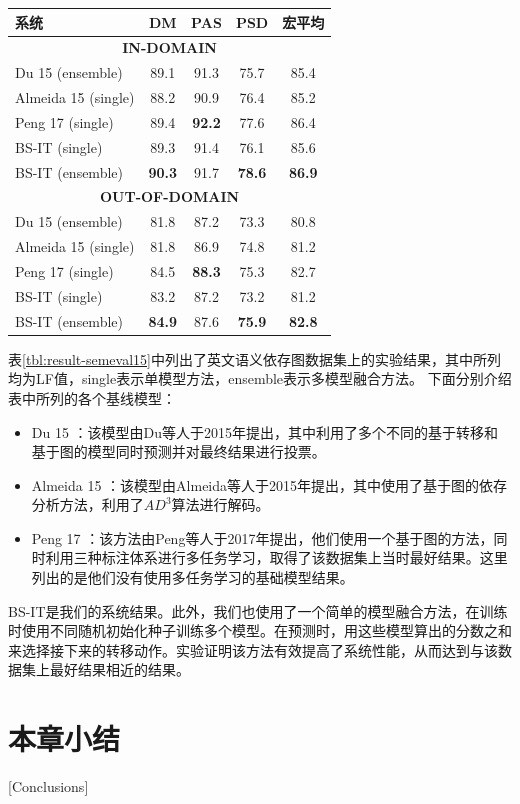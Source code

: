 \begin{table}[htpb]
	\centering
	\small
	\renewcommand{\arraystretch}{1.2}
	\begin{tabular}{l|ccc|c}
		\hline
		\bf 系统&\bf DM&\bf PAS&\bf PSD &\bf 宏平均\\
		\hline
		\multicolumn{5}{c}{\bf IN-DOMAIN}\\
		\hline
		Du 15 (ensemble) &89.1&91.3&75.7&85.4\\
		Almeida 15 (single) &88.2&90.9&76.4&85.2\\
		Peng 17 (single) &89.4&\bf 92.2&77.6&86.4\\
		\hline
		BS-IT (single) &89.3&91.4&76.1&85.6\\
		BS-IT (ensemble) &\bf 90.3& 91.7&\bf 78.6&\bf 86.9\\
		\hline
		\multicolumn{5}{c}{\bf OUT-OF-DOMAIN}\\
		\hline
		Du 15 (ensemble) &81.8&87.2&73.3&80.8\\
		Almeida 15 (single) &81.8&86.9&74.8&81.2\\
		Peng 17 (single) &84.5&\bf 88.3&75.3&82.7\\
		\hline
		BS-IT (single) &83.2&87.2&73.2&81.2\\
		BS-IT (ensemble) &\bf 84.9&87.6&\bf 75.9&\bf 82.8\\
		\hline
	\end{tabular}
\end{table}

表\ref{tbl:result-semeval15}中列出了英文语义依存图数据集上的实验结果，其中所列均为LF值，single表示单模型方法，ensemble表示多模型融合方法。
下面分别介绍表中所列的各个基线模型：
\begin{itemize}
    \item Du 15 \cite{du-etal-2015-peking} ：该模型由Du等人于2015年提出，其中利用了多个不同的基于转移和基于图的模型同时预测并对最终结果进行投票。
    \item Almeida 15 \cite{almeida-martins-2015-lisbon}：该模型由Almeida等人于2015年提出，其中使用了基于图的依存分析方法，利用了$AD^3$算法进行解码。
    \item Peng 17 \cite{peng-etal-2017-deep}：该方法由Peng等人于2017年提出，他们使用一个基于图的方法，同时利用三种标注体系进行多任务学习，取得了该数据集上当时最好结果。这里列出的是他们没有使用多任务学习的基础模型结果。
\end{itemize}

BS-IT是我们的系统结果。此外，我们也使用了一个简单的模型融合方法，在训练时使用不同随机初始化种子训练多个模型。在预测时，用这些模型算出的分数之和来选择接下来的转移动作。实验证明该方法有效提高了系统性能，从而达到与该数据集上最好结果相近的结果。



\section{本章小结}[Conclusions]


